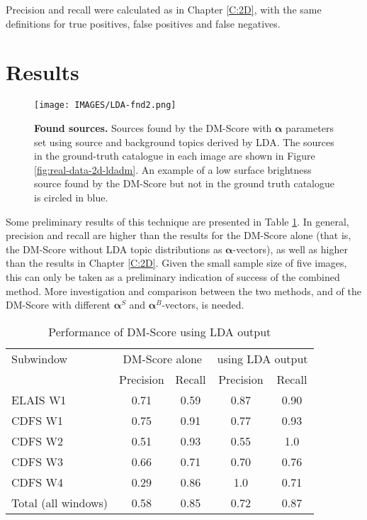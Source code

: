 Precision and recall were calculated as in Chapter \ref{C:2D}, with the same definitions for true positives, false positives and false negatives.

\section{Results}

\begin{figure}
\centering
\texttt{[image: IMAGES/LDA-fnd2.png]}
\caption[Results of the DM-Score combined with LDA]{\textbf{Found sources.} Sources found by the DM-Score with $\boldsymbol{\alpha}$ parameters set using source and background topics derived by LDA. The sources in the ground-truth catalogue in each image are shown in Figure \ref{fig:real-data-2d-ldadm}. An example of a low surface brightness source found by the DM-Score but not in the ground truth catalogue is circled in blue.}
\label{fig:results-all}
\end{figure}

Some preliminary results of this technique are presented in Table \ref{table:2d-lda-real}. In general, precision and recall are higher than the results for the DM-Score alone (that is, the DM-Score without LDA topic distributions as $\boldsymbol{\alpha}$-vectors), as well as higher than the results in Chapter \ref{C:2D}. Given the small sample size of five images, this can only be taken as a preliminary indication of success of the combined method. More investigation and comparison between the two methods, and of the DM-Score with different $\boldsymbol{\alpha}^S$ and $\boldsymbol{\alpha}^B$-vectors, is needed.

\begin{table}
\centering
\caption[Performance of DM-Score using LDA output]{Performance of DM-Score using LDA output}
\begin{tabular}{l| c c| c c}
\hline
Subwindow & \multicolumn{2}{c|}{DM-Score alone} & \multicolumn{2}{|c}{using LDA output} \\ 
          & Precision & Recall& Precision & Recall \\ \hline
ELAIS W1  & 0.71 & 0.59 & 0.87 & 0.90\\ %
CDFS W1   & 0.75 & 0.91 & 0.77 & 0.93 \\ %
CDFS W2   & 0.51 & 0.93 & 0.55 & 1.0 \\ %
CDFS W3   & 0.66 & 0.71 & 0.70 & 0.76 \\ %
CDFS W4   & 0.29 & 0.86 & 1.0  & 0.71 \\\hline %
Total (all windows) & 0.58 & 0.85 & 0.72 & 0.87 \\\hline
\end{tabular}
\label{table:2d-lda-real}
\end{table}

